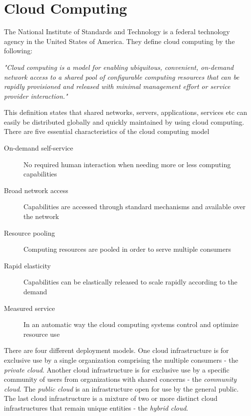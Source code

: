 \documentclass[11pt]{report}
\begin{document}
\section{Cloud Computing}
The National Institute of Standards and Technology is a federal technology agency in the United States of America. They define cloud computing by the following:
\begin{center}
\emph{"Cloud computing is a model for enabling ubiquitous, convenient, on-demand network access to a shared pool of configurable computing resources that can be rapidly provisioned and released with minimal management effort or service provider interaction."} \cite{clouddefinition}
\end{center}
This definition states that shared networks, servers, applications, services etc can easily be distributed globally and quickly maintained by using cloud computing.\\

There are five essential characteristics of the cloud computing model
\begin{description}
\item[On-demand self-service] No required human interaction when needing more or less computing capabilities
\item[Broad network access] Capabilities are accessed through standard mechanisms and available over the network
\item[Resource pooling] Computing resources are pooled in order to serve multiple consumers 
\item[Rapid elasticity] Capabilities can be elastically released to scale rapidly according to the demand
\item[Measured service] In an automatic way the cloud computing systems control and optimize resource use
\end{description}

There are four different deployment models. One cloud infrastructure is for exclusive use by a single organization comprising the multiple consumers - the \emph{private cloud}. Another cloud infrastructure is for exclusive use by a specific community of users from organizations with shared concerns - the \emph{community cloud}. The \emph{public cloud} is an infrastructure open for use by the general public. The last cloud infrastructure is a mixture of two or more distinct cloud infrastructures that remain unique entities - the \emph{hybrid cloud}.
\end{document}
